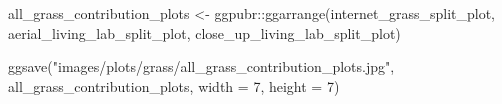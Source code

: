 \documentclass[
  letterpaper,
  DIV=11,
  numbers=noendperiod]{scrreprt}
\newenvironment{Shaded}{\begin{snugshade}}{\end{snugshade}}
\newcommand{\AttributeTok}[1]{\textcolor[rgb]{0.40,0.45,0.13}{#1}}
\newcommand{\DecValTok}[1]{\textcolor[rgb]{0.68,0.00,0.00}{#1}}
\newcommand{\FunctionTok}[1]{\textcolor[rgb]{0.28,0.35,0.67}{#1}}
\newcommand{\NormalTok}[1]{\textcolor[rgb]{0.00,0.23,0.31}{#1}}
\newcommand{\OtherTok}[1]{\textcolor[rgb]{0.00,0.23,0.31}{#1}}
\newcommand{\SpecialCharTok}[1]{\textcolor[rgb]{0.37,0.37,0.37}{#1}}
\newcommand{\StringTok}[1]{\textcolor[rgb]{0.13,0.47,0.30}{#1}}
\begin{document}
\begin{Shaded}
\begin{Highlighting}[]
\NormalTok{all\_grass\_contribution\_plots }\OtherTok{\textless{}{-}}\NormalTok{ ggpubr}\SpecialCharTok{::}\FunctionTok{ggarrange}\NormalTok{(internet\_grass\_split\_plot, }
\NormalTok{                                                  aerial\_living\_lab\_split\_plot, }
\NormalTok{                                                  close\_up\_living\_lab\_split\_plot)}

\FunctionTok{ggsave}\NormalTok{(}\StringTok{"images/plots/grass/all\_grass\_contribution\_plots.jpg"}\NormalTok{, }
\NormalTok{       all\_grass\_contribution\_plots, }
       \AttributeTok{width =} \DecValTok{7}\NormalTok{, }
       \AttributeTok{height =} \DecValTok{7}\NormalTok{)}
\end{Highlighting}
\end{Shaded}
\end{document}
